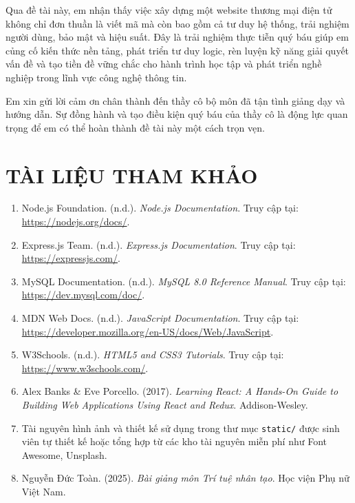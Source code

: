 Qua đề tài này, em nhận thấy việc xây dựng một website thương mại điện tử không chỉ đơn thuần là viết mã mà còn bao gồm cả tư duy hệ thống, trải nghiệm người dùng, bảo mật và hiệu suất. Đây là trải nghiệm thực tiễn quý báu giúp em củng cố kiến thức nền tảng, phát triển tư duy logic, rèn luyện kỹ năng giải quyết vấn đề và tạo tiền đề vững chắc cho hành trình học tập và phát triển nghề nghiệp trong lĩnh vực công nghệ thông tin.

Em xin gửi lời cảm ơn chân thành đến thầy cô bộ môn đã tận tình giảng dạy và hướng dẫn. Sự đồng hành và tạo điều kiện quý báu của thầy cô là động lực quan trọng để em có thể hoàn thành đề tài này một cách trọn vẹn.

\newpage
\chapter*{TÀI LIỆU THAM KHẢO}

\begin{enumerate}
    \item Node.js Foundation. (n.d.). \textit{Node.js Documentation}. Truy cập tại: \url{https://nodejs.org/docs/}.

    \item Express.js Team. (n.d.). \textit{Express.js Documentation}. Truy cập tại: \url{https://expressjs.com/}.

    \item MySQL Documentation. (n.d.). \textit{MySQL 8.0 Reference Manual}. Truy cập tại: \url{https://dev.mysql.com/doc/}.

    \item MDN Web Docs. (n.d.). \textit{JavaScript Documentation}. Truy cập tại: \url{https://developer.mozilla.org/en-US/docs/Web/JavaScript}.

    \item W3Schools. (n.d.). \textit{HTML5 and CSS3 Tutorials}. Truy cập tại: \url{https://www.w3schools.com/}.

    \item Alex Banks \& Eve Porcello. (2017). \textit{Learning React: A Hands-On Guide to Building Web Applications Using React and Redux}. Addison-Wesley.

    \item Tài nguyên hình ảnh và thiết kế sử dụng trong thư mục \texttt{static/} được sinh viên tự thiết kế hoặc tổng hợp từ các kho tài nguyên miễn phí như Font Awesome, Unsplash.

    \item Nguyễn Đức Toàn. (2025). \textit{Bài giảng môn Trí tuệ nhân tạo}. Học viện Phụ nữ Việt Nam.
\end{enumerate}

 
